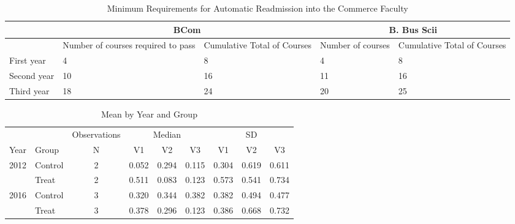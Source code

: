 \begin{table}[htbp]
\caption{Minimum Requirements for Automatic Readmission into the Commerce Faculty}
\centering
\begin{tabular}{p{}p{}p{}p{}p{}} \\ \toprule

& \multicolumn{2}{c}{BCom} & \multicolumn{2}{c}{B. Bus Scii} \\ \midrule
& \multicolumn{1}{p{3.5cm}}{Number of courses required to pass} & Cumulative Total of Courses & \multicolumn{1}{p{2cm}}{Number of courses} & Cumulative Total of Courses \\ \midrule
First year & 4 & 8 & 4 & 8 \\
Second year & 10 & 16 & 11 & 16 \\
Third year & 18 & 24 & 20 & 25 \\ \bottomrule
\end{tabular}
\end{table}

\begin{table}[ht]
\centering
\begin{tabular}{@{\extracolsep{4pt}}llccccccc}
\toprule
{} & {} & {Observations} & \multicolumn{3}{c}{Median}  & \multicolumn{3}{c}{SD}\\
 \cmidrule{3-3}
 \cmidrule{4-6}
 \cmidrule{7-9}
 Year & Group & N & V1 & V2 & V3 & V1 & V2 & V3 \\
\midrule
2012  & Control & 2 & 0.052 & 0.294 & 0.115 & 0.304 & 0.619 & 0.611 \\
  & Treat & 2 & 0.511 & 0.083 & 0.123 & 0.573 & 0.541 & 0.734 \\
2016  & Control & 3 & 0.320 & 0.344 & 0.382 & 0.382 & 0.494 & 0.477 \\
  & Treat & 3 & 0.378 & 0.296 & 0.123 & 0.386 & 0.668 & 0.732 \\
\bottomrule
\end{tabular}
\caption{Mean by Year and Group}
\end{table}
























